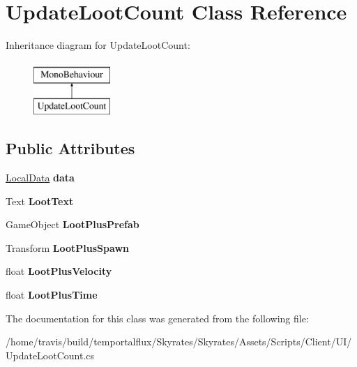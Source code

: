 \hypertarget{class_update_loot_count}{\section{Update\-Loot\-Count Class Reference}
\label{class_update_loot_count}
}
Inheritance diagram for Update\-Loot\-Count\-:\begin{figure}[H]
\begin{center}
\leavevmode
\includegraphics[height=2.000000cm]{class_update_loot_count}
\end{center}
\end{figure}
\subsection*{Public Attributes}
\begin{DoxyCompactItemize}
\item 
\hypertarget{class_update_loot_count_a6ef9556cf95dd8e588ba2868d756196f}{\hyperlink{class_skyrates_1_1_client_1_1_data_1_1_local_data}{Local\-Data} {\bfseries data}}\label{class_update_loot_count_a6ef9556cf95dd8e588ba2868d756196f}

\item 
\hypertarget{class_update_loot_count_a66ef1fc818e702ba3272d51f59420837}{Text {\bfseries Loot\-Text}}\label{class_update_loot_count_a66ef1fc818e702ba3272d51f59420837}

\item 
\hypertarget{class_update_loot_count_a17a0feb1a09f4a8e6e8167dfbe8ffe5f}{Game\-Object {\bfseries Loot\-Plus\-Prefab}}\label{class_update_loot_count_a17a0feb1a09f4a8e6e8167dfbe8ffe5f}

\item 
\hypertarget{class_update_loot_count_aa486b65519bc7e53f414b8b811e5ad7d}{Transform {\bfseries Loot\-Plus\-Spawn}}\label{class_update_loot_count_aa486b65519bc7e53f414b8b811e5ad7d}

\item 
\hypertarget{class_update_loot_count_a2f8ecd465052802cd5a178d417313491}{float {\bfseries Loot\-Plus\-Velocity}}\label{class_update_loot_count_a2f8ecd465052802cd5a178d417313491}

\item 
\hypertarget{class_update_loot_count_a2ad3f5d3101ac566d513ec5f4dfd5a1a}{float {\bfseries Loot\-Plus\-Time}}\label{class_update_loot_count_a2ad3f5d3101ac566d513ec5f4dfd5a1a}

\end{DoxyCompactItemize}


The documentation for this class was generated from the following file\-:\begin{DoxyCompactItemize}
\item 
/home/travis/build/temportalflux/\-Skyrates/\-Skyrates/\-Assets/\-Scripts/\-Client/\-U\-I/Update\-Loot\-Count.\-cs\end{DoxyCompactItemize}
